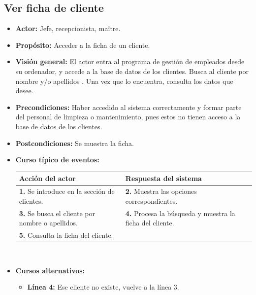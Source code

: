 \documentclass[spanish,a4paper,11pt, twoside]{report}	%
\begin{document}
	\subsection{Ver ficha de cliente}
			\begin{itemize}
			\item \textbf{Actor:} Jefe, recepcionista, maître.
			\item \textbf{Propósito:} Acceder a la ficha de un cliente.
			\item \textbf{Visión general:} El actor entra al programa de gestión de
						empleados desde su ordenador, y accede a la base de datos de los clientes. Busca
						al cliente por nombre y/o apellidos . Una vez que lo encuentra, consulta los
						datos que desee.
			\item \textbf{Precondiciones:} Haber accedido al sistema correctamente y formar
						parte del personal de limpieza o mantenimiento, pues estos no tienen acceso a la
						base de datos de los clientes.
			\item \textbf{Postcondiciones:} Se muestra la ficha.
			\item \textbf{Curso típico de eventos:} 	\\
				\begin{tabular}{|p{6cm}||p{6cm}|}
				\hline
				\textbf{Acción del actor} & \textbf{Respuesta del sistema} \\ \hline \hline
				\textbf{1.} Se introduce en la sección  de clientes. & 
				\textbf{2.} Muestra las opciones correspondientes. \\ \hline 
				\textbf{3.} Se busca el cliente por nombre o apellidos.  & 
				\textbf{4.} Procesa la búsqueda y muestra la ficha del cliente. \\ \hline 
				\textbf{5.} Consulta la ficha del cliente.& \\ \hline
				
			\end{tabular}
			\\
			\item \textbf{Cursos alternativos:} 
			\begin{itemize}
			\item  \textbf{Línea 4:} Ese cliente no existe, vuelve a la línea 3.
			\end {itemize}
		\end{itemize}


	\hspace{-1.2 true cm}	
\end{document}
